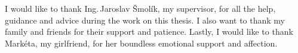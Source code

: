 \documentclass[english,master,unicode]{ctufit-thesis}
\theoremstyle{plain}
\theoremstyle{definition}
\theoremstyle{remark}
\numberwithin{theorem}{chapter}
\begin{document}
\frontmatter\frontmatterinit %


\thispagestyle{empty}\cleardoublepage\maketitle %

\imprintpage %

\tableofcontents %
\listoffigures %
\begingroup
\let\clearpage\relax
\listoftables %
\listoflistings %
\endgroup

\begin{acknowledgmentpage}
  I would like to thank Ing.\,Jaroslav Šmolík, my supervisor, for all the help, guidance and advice during the work on this thesis. I also want to thank my family and friends for their support and patience. Lastly, I would like to thank Markéta, my girlfriend, for her boundless emotional support and affection.
\end{acknowledgmentpage}
\end{document}
